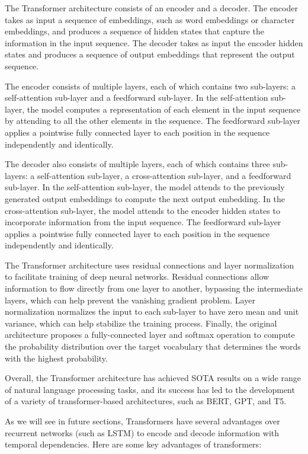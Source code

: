 The Transformer architecture consists of an encoder and a decoder. The encoder takes as input a sequence of embeddings, such as word embeddings or character embeddings, and produces a sequence of hidden states that capture the information in the input sequence. The decoder takes as input the encoder hidden states and produces a sequence of output embeddings that represent the output sequence.

The encoder consists of multiple layers, each of which contains two sub-layers: a self-attention sub-layer and a feedforward sub-layer. In the self-attention sub-layer, the model computes a representation of each element in the input sequence by attending to all the other elements in the sequence. The feedforward sub-layer applies a pointwise fully connected layer to each position in the sequence independently and identically.

The decoder also consists of multiple layers, each of which contains three sub-layers: a self-attention sub-layer, a cross-attention sub-layer, and a feedforward sub-layer. In the self-attention sub-layer, the model attends to the previously generated output embeddings to compute the next output embedding. In the cross-attention sub-layer, the model attends to the encoder hidden states to incorporate information from the input sequence. The feedforward sub-layer applies a pointwise fully connected layer to each position in the sequence independently and identically.

The Transformer architecture uses residual connections and layer normalization to facilitate training of deep neural networks. Residual connections allow information to flow directly from one layer to another, bypassing the intermediate layers, which can help prevent the vanishing gradient problem. Layer normalization normalizes the input to each sub-layer to have zero mean and unit variance, which can help stabilize the training process. Finally, the original architecture proposes a fully-connected layer and softmax operation to compute the probability distribution over the target vocabulary that determines the words with the highest probability.

Overall, the Transformer architecture has achieved \ac{SOTA} results on a wide range of natural language processing tasks, and its success has led to the development of a variety of transformer-based architectures, such as BERT, GPT, and T5.

As we will see in future sections, Transformers have several advantages over recurrent networks (such as \ac{LSTM}) to encode and decode information with temporal dependencies. Here are some key advantages of transformers:

